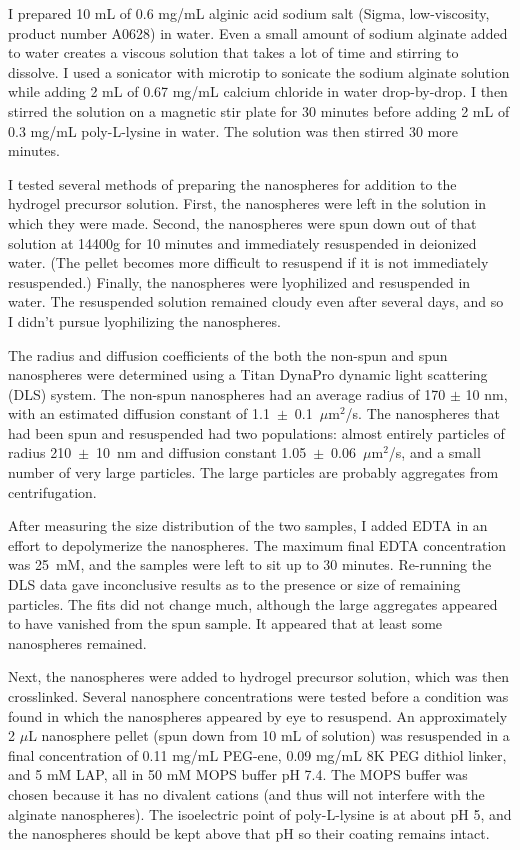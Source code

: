 I prepared 10 mL of 0.6 mg/mL alginic acid sodium salt (Sigma, low-viscosity, product number A0628) in water.  Even a small amount of sodium alginate added to water creates a viscous solution that takes a lot of time and stirring to dissolve.  I used a sonicator with  microtip to sonicate the sodium alginate solution while adding 2 mL of 0.67 mg/mL calcium chloride in water drop-by-drop.  I then stirred the solution on a magnetic stir plate for 30 minutes before adding 2 mL of 0.3 mg/mL poly-L-lysine in water.  The solution was then stirred 30 more minutes.

I tested several methods of preparing the nanospheres for addition to the hydrogel precursor solution.  First, the nanospheres were left in the solution in which they were made.  Second, the nanospheres were spun down out of that solution at 14400g for 10 minutes and immediately resuspended in deionized water.  (The pellet becomes more difficult to resuspend if it is not immediately resuspended.) Finally, the nanospheres were lyophilized and resuspended in water.  The resuspended solution remained cloudy even after several days, and so I didn't pursue lyophilizing the nanospheres.

The radius and diffusion coefficients of the both the non-spun and spun nanospheres were determined using a Titan DynaPro dynamic light scattering (DLS) system.  The non-spun nanospheres had an average radius of 170 $\pm$ 10 nm, with an estimated diffusion constant of 1.1~$\pm$~0.1~$\mu$m$^2$/s.  The nanospheres that had been spun and resuspended had two populations: almost entirely particles of radius 210~$\pm$~10~nm and diffusion constant 1.05~$\pm$~0.06~$\mu$m$^2$/s, and a small number of very large particles.  The large particles are probably aggregates from centrifugation.

After measuring the size distribution of the two samples, I added EDTA in an effort to depolymerize the nanospheres.  The maximum final EDTA concentration was 25~mM, and the samples were left to sit up to 30 minutes.  Re-running the DLS data gave inconclusive results as to the presence or size of remaining particles.  The fits did not change much, although the large aggregates appeared to have vanished from the spun sample.  It appeared that at least some nanospheres remained.

Next, the nanospheres were added to hydrogel precursor solution, which was then crosslinked.  Several nanosphere concentrations were tested before a condition was found in which the nanospheres appeared by eye to resuspend.  An approximately 2 $\mu$L nanosphere pellet (spun down from 10 mL of solution) was resuspended in a final concentration of 0.11 mg/mL PEG-ene, 0.09 mg/mL 8K PEG dithiol linker, and 5 mM LAP, all in 50 mM MOPS buffer pH 7.4.  The MOPS buffer was chosen because it has no divalent cations (and thus will not interfere with the alginate nanospheres).  The isoelectric point of poly-L-lysine is at about pH 5, and the nanospheres should be kept above that pH so their coating remains intact.

